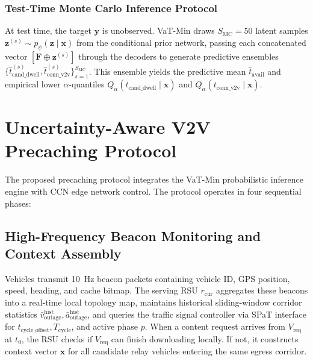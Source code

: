 \documentclass[journal]{IEEEtran}
\begin{document}
\subsubsection{Test-Time Monte Carlo Inference Protocol}
At test time, the target $\mathbf{y}$ is unobserved. VaT-Min draws $S_{\text{MC}} = 50$ latent samples $\mathbf{z}^{(s)} \sim p_\psi(\mathbf{z} \mid \mathbf{x})$ from the conditional prior network, passing each concatenated vector $[\mathbf{F} \oplus \mathbf{z}^{(s)}]$ through the decoders to generate predictive ensembles $\{\hat{t}_{\text{cand\_dwell}}^{(s)}, \hat{t}_{\text{conn\_v2v}}^{(s)}\}_{s=1}^{S_{\text{MC}}}$. This ensemble yields the predictive mean $\hat{t}_{\text{avail}}$ and empirical lower $\alpha$-quantiles $Q_\alpha(t_{\text{cand\_dwell}} \mid \mathbf{x})$ and $Q_\alpha(t_{\text{conn\_v2v}} \mid \mathbf{x})$.


\section{Uncertainty-Aware V2V Precaching Protocol}\label{sec:protocol}

The proposed precaching protocol integrates the VaT-Min probabilistic inference engine with CCN edge network control. The protocol operates in four sequential phases:

\subsection{High-Frequency Beacon Monitoring and Context Assembly}
Vehicles transmit 10~Hz beacon packets containing vehicle ID, GPS position, speed, heading, and cache bitmap. The serving RSU $r_{\text{cur}}$ aggregates these beacons into a real-time local topology map, maintains historical sliding-window corridor statistics $\bar{v}_{\text{outage}}^{\text{hist}}, \bar{a}_{\text{outage}}^{\text{hist}}$, and queries the traffic signal controller via SPaT interface for $t_{\text{cycle\_offset}}, T_{\text{cycle}}$, and active phase $p$. When a content request arrives from $V_{\text{req}}$ at $t_0$, the RSU checks if $V_{\text{req}}$ can finish downloading locally. If not, it constructs context vector $\mathbf{x}$ for all candidate relay vehicles entering the same egress corridor.
\end{document}
